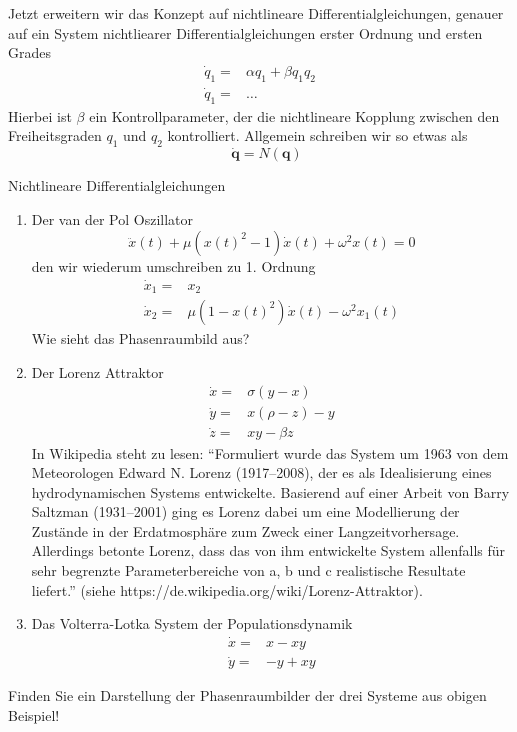 Jetzt erweitern wir das Konzept auf nichtlineare Differentialgleichungen,
genauer auf ein System nichtliearer Differentialgleichungen erster Ordnung und
ersten Grades
\begin{align*}
\dot q_1 =& \alpha q_1 + \beta q_1q_2\\
\dot q_1 =&\dots
\end{align*}
Hierbei ist $\beta$ ein Kontrollparameter, der die nichtlineare Kopplung
zwischen den Freiheitsgraden $q_1$ und $q_2$ kontrolliert. Allgemein schreiben
wir so etwas als
\begin{equation}
  \quad\dot{\mathbf{q}}=N(\mathbf{q})
  \label{eq:NLDGLSystem}
\end{equation}
\begin{example}{Nichtlineare Differentialgleichungen}
  \begin{enumerate}
   \item Der van der Pol Oszillator
    \[\ddot x(t)+\mu(x(t)^2-1)\dot x(t)+\omega^2x(t)=0 \]
    den wir wiederum umschreiben zu 1. Ordnung
    \begin{align*}
     \dot x_1=&x_2\\
     \dot x_2=&\mu(1-x(t)^2)\dot x(t)-\omega^2x_1(t)
    \end{align*}
    Wie sieht das Phasenraumbild aus?
   \item Der Lorenz Attraktor
     \begin{align*}
       \dot x=&\sigma(y-x)\\
       \dot y=&x(\rho-z)-y\\
     \dot z=&xy-\beta z
    \end{align*}
     In Wikipedia steht zu lesen:
     ``Formuliert wurde das System um 1963 von dem Meteorologen Edward N. Lorenz
     (1917–2008), der es als Idealisierung eines hydrodynamischen Systems
     entwickelte. Basierend auf einer Arbeit von Barry Saltzman (1931–2001)
     ging es Lorenz dabei um eine Modellierung der Zustände in der
     Erdatmosphäre zum Zweck einer Langzeitvorhersage. Allerdings betonte
     Lorenz, dass das von ihm entwickelte System allenfalls für sehr begrenzte
     Parameterbereiche von a, b und c realistische
      Resultate liefert.'' (siehe https://de.wikipedia.org/wiki/Lorenz-Attraktor).
   \item Das Volterra-Lotka System der Populationsdynamik
     \begin{align*}
       \dot x=&x-xy\\
       \dot y=&-y+xy
     \end{align*}
  \end{enumerate}
\end{example}
Finden Sie ein Darstellung der Phasenraumbilder der drei Systeme aus obigen
Beispiel!
